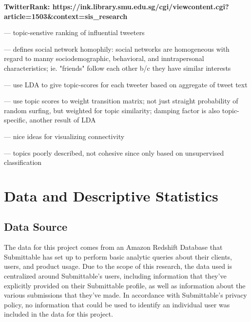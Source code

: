 \documentclass[]{report}   %
\begin{document}
\textbf{TwitterRank: https://ink.library.smu.edu.sg/cgi/viewcontent.cgi?article=1503\&context=sis\_research}

--- topic-senstive ranking of influential tweeters

--- defines social network homophily: social networks are homogeneous with regard to manny sociodemographic, behavioral, and inntrapersonal characteristics; ie. "friends" follow each other b/c they have similar interests

--- use LDA to give topic-scores for each tweeter based on aggregate of tweet text

--- use topic scores to weight transition matrix; not just straight probability of random surfing, but weighted for topic similarity; damping factor is also topic-specific, another result of LDA

--- nice ideas for visualizing connectivity

--- topics poorly described, not cohesive since only based on unsupervised classification


\chapter{Data and Descriptive Statistics}         
\section{Data Source}
The data for this project comes from an Amazon Redshift Database that Submittable has set up to perform basic analytic queries about their clients, users, and product usage. Due to the scope of this research, the data used is centralized around Submittable's users, including information that they've explicitly provided on their Submittable profile, as well as information about the various submissions that they've made. In accordance with Submittable's privacy policy, no information that could be used to identify an individual user was included in the data for this project.
\end{document}

